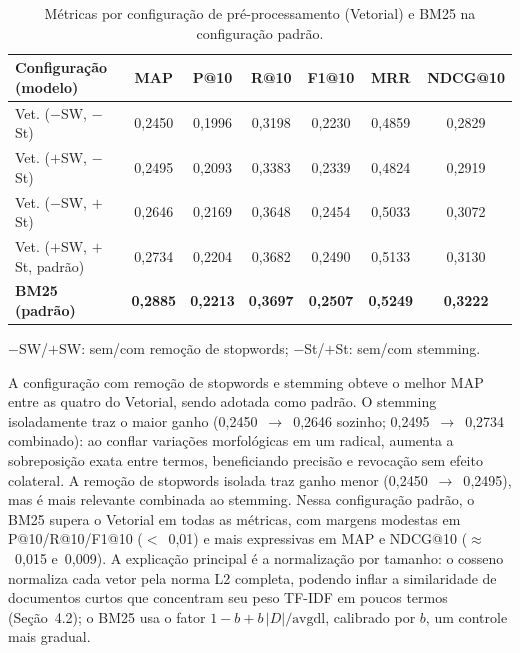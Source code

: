 \documentclass[runningheads]{llncs}
\begin{document}
\begin{table}[t]
\centering
\caption{Métricas por configuração de pré-processamento (Vetorial) e BM25 na configuração padrão.}
\label{tab:preproc-results}
\footnotesize
\setlength{\tabcolsep}{3.5pt}
\begin{tabular}{lcccccc}
\toprule
Configuração (modelo) & MAP & P@10 & R@10 & F1@10 & MRR & NDCG@10\\
\midrule
Vet. ($-$SW, $-$St)          & 0{,}2450 & 0{,}1996 & 0{,}3198 & 0{,}2230 & 0{,}4859 & 0{,}2829\\
Vet. ($+$SW, $-$St)          & 0{,}2495 & 0{,}2093 & 0{,}3383 & 0{,}2339 & 0{,}4824 & 0{,}2919\\
Vet. ($-$SW, $+$St)          & 0{,}2646 & 0{,}2169 & 0{,}3648 & 0{,}2454 & 0{,}5033 & 0{,}3072\\
Vet. ($+$SW, $+$St, padrão)  & 0{,}2734 & 0{,}2204 & 0{,}3682 & 0{,}2490 & 0{,}5133 & 0{,}3130\\
\textbf{BM25 (padrão)} & \textbf{0{,}2885} & \textbf{0{,}2213} & \textbf{0{,}3697} & \textbf{0{,}2507} & \textbf{0{,}5249} & \textbf{0{,}3222}\\
\bottomrule
\end{tabular}
\par\vspace{1pt}\footnotesize $-$SW/$+$SW: sem/com remoção de stopwords; $-$St/$+$St: sem/com stemming.
\end{table}

A configuração com remoção de stopwords e stemming obteve o melhor MAP entre as quatro do Vetorial, sendo adotada como padrão. O stemming isoladamente traz o maior ganho (0{,}2450~$\to$~0{,}2646 sozinho; 0{,}2495~$\to$~0{,}2734 combinado): ao conflar variações morfológicas em um radical, aumenta a sobreposição exata entre termos, beneficiando precisão e revocação sem efeito colateral. A remoção de stopwords isolada traz ganho menor (0{,}2450~$\to$~0{,}2495), mas é mais relevante combinada ao stemming. Nessa configuração padrão, o BM25 supera o Vetorial em todas as métricas, com margens modestas em P@10/R@10/F1@10 ($<$~0{,}01) e mais expressivas em MAP e NDCG@10 ($\approx$~0{,}015 e~0{,}009). A explicação principal é a normalização por tamanho: o cosseno normaliza cada vetor pela norma L2 completa, podendo inflar a similaridade de documentos curtos que concentram seu peso TF-IDF em poucos termos (Seção~4.2); o BM25 usa o fator $1-b+b\,|D|/\text{avgdl}$, calibrado por $b$, um controle mais gradual.

\vspace{-1.0em}
\end{document}

